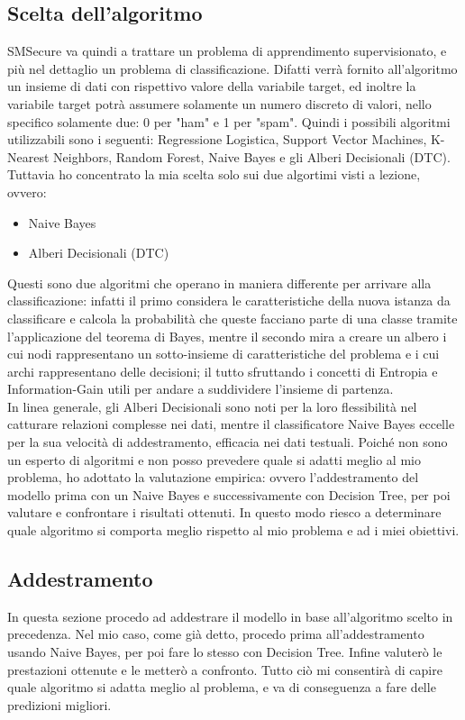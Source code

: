 \documentclass[]{article}
\begin{document}
            \subsection{Scelta dell'algoritmo}
                SMSecure va quindi a trattare un problema di apprendimento supervisionato, e più nel dettaglio un problema di classificazione. Difatti verrà fornito all'algoritmo un insieme di dati con rispettivo valore della variabile target, ed inoltre la variabile target potrà assumere solamente un numero discreto di valori, nello specifico solamente due: 0 per "ham" e 1 per "spam". Quindi i possibili algoritmi utilizzabili sono i seguenti: Regressione Logistica, Support Vector Machines, K-Nearest Neighbors, Random Forest, Naive Bayes e gli Alberi Decisionali (DTC).\\
                Tuttavia ho concentrato la mia scelta solo sui due algortimi visti a lezione, ovvero:
                \begin{itemize}
                    \item Naive Bayes
                    \item Alberi Decisionali (DTC)
                \end{itemize}
                Questi sono due algoritmi che operano in maniera differente per arrivare alla classificazione: infatti il primo considera le caratteristiche della nuova istanza da classificare e calcola la probabilità che queste facciano parte di una classe tramite l’applicazione del teorema di Bayes, mentre il secondo mira a creare un albero i cui nodi rappresentano un sotto-insieme di caratteristiche del problema e i cui archi rappresentano delle decisioni; il tutto sfruttando i concetti di Entropia e Information-Gain utili per andare a suddividere l'insieme di partenza.\\
                In linea generale, gli Alberi Decisionali sono noti per la loro flessibilità nel catturare relazioni complesse nei dati, mentre il classificatore Naive Bayes eccelle per la sua velocità di addestramento, efficacia nei dati testuali. Poiché non sono un esperto di algoritmi e non posso prevedere quale si adatti meglio al mio problema, ho adottato la valutazione empirica:  ovvero l'addestramento del modello prima con un Naive Bayes e successivamente con Decision Tree, per poi valutare e confrontare i risultati ottenuti. In questo modo riesco a determinare quale algoritmo si comporta meglio rispetto al mio problema e ad i miei obiettivi.

            \subsection{Addestramento}
                In questa sezione procedo ad addestrare il modello in base all'algoritmo scelto in precedenza. Nel mio caso, come già detto,  procedo prima all'addestramento usando Naive Bayes, per poi fare lo stesso con Decision Tree. Infine valuterò le prestazioni ottenute e le metterò a confronto. Tutto ciò mi consentirà di capire quale algoritmo si adatta meglio al problema, e va di conseguenza a fare delle predizioni migliori.\\
\end{document}
